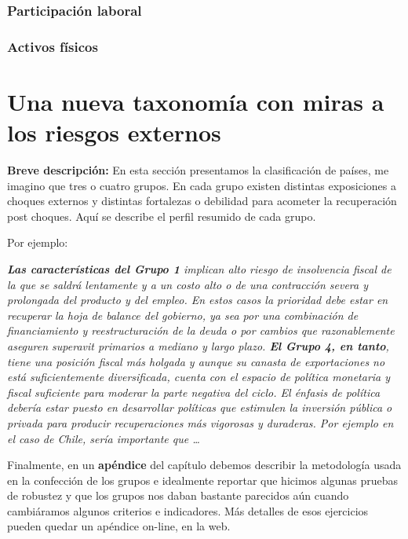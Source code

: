 \documentclass[12pt,a4paper]{article}
\begin{document}
\subsubsection{Participación laboral}
\subsubsection{Activos físicos}



\newpage
\section{Una nueva taxonomía con miras a los riesgos externos}

\textbf{Breve descripción:} \newline
En esta sección presentamos la clasificación de países, me imagino que tres o cuatro grupos. En cada grupo existen distintas exposiciones a choques externos y distintas fortalezas o debilidad para acometer la recuperación post choques. Aquí se describe el perfil resumido de cada grupo.


\vspace{0.5cm}
Por ejemplo: 

\textit{\textbf{Las características del Grupo 1} implican alto riesgo de insolvencia fiscal de la que se saldrá lentamente y a un costo alto o de una contracción severa y prolongada del producto y del empleo. En estos casos la prioridad debe estar en recuperar la hoja de balance del gobierno, ya sea por una combinación de financiamiento y reestructuración de la deuda o por cambios que razonablemente aseguren superavit primarios a mediano y largo plazo. \newline
\textbf{El Grupo 4, en tanto}, tiene una posición fiscal más holgada y aunque su canasta de exportaciones no está suficientemente diversificada, cuenta con el espacio de política monetaria y fiscal suficiente para moderar la parte negativa del ciclo. El énfasis de política debería estar puesto en desarrollar políticas que estimulen la inversión pública o privada para producir recuperaciones más vigorosas y duraderas. Por ejemplo en el caso de Chile, sería importante que \ldots
}


\vspace{0.5cm}
Finalmente, en un \textbf{apéndice} del capítulo debemos describir la metodología usada en la confección de los grupos e idealmente reportar que hicimos algunas pruebas de robustez y que los grupos nos daban bastante parecidos aún cuando cambiáramos algunos criterios e indicadores. Más detalles de esos ejercicios pueden quedar un apéndice on-line, en la web.
\vspace{0.5cm}
\end{document}
